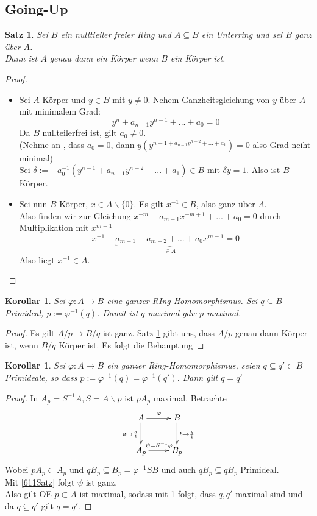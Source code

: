 \documentclass[10pt,a4paper]{article}
\newcounter{thm}[section]
\theoremstyle{definition}
\theoremstyle{plain}
\newtheorem{kor}[thm]{Korollar}
\newtheorem{satz}[thm]{Satz}
\theoremstyle{remark}
\begin{document}
\subsection{Going-Up}

\begin{satz}\label{614Satz}
	Sei $B$ ein nulltieiler freier Ring und $A\subseteq B$ ein Unterring und sei $B$ ganz über $A$.\\
	Dann ist $A$ genau dann ein Körper wenn $B$ ein Körper ist.
\end{satz}
\begin{proof}
	\begin{itemize}
		\item Sei $A$ Körper und $y\in B$ mit $y\neq 0$. Nehem Ganzheitsgleichung von $y$ über $A$ mit minimalem Grad:\\
		\[y^n+a_{n-1}y^{n-1}+...+a_0=0\]
		Da $B$ nullteilerfrei ist, gilt $a_0\neq 0$.\\
		(Nehme an , dass $a_0=0$, dann $y(y^{n-1+a_{n-1}y^{n-2}+...+a_1})=0$ also Grad nciht minimal)\\
		Sei $\delta:=-a_0^{-1}(y^{n-1}+a_{n-1}y^{n-2}+...+a_1)\in B$ mit $\delta y=1.$ Also ist $B$ Körper.
		\item Sei nun $B$ Körper, $x\in A\backslash\{0\}$. Es gilt $x^{-1}\in B$, also ganz über $A$.\\
		Also finden wir zur Gleichung $x^{-m}+a_{m-1}x^{-m+1}+...+a_0=0$ durch Multiplikation mit $x^{m-1}$
		\[x^{-1}+\underbrace{a_{m-1}+a_{m-2}+...+a_0x^{m-1}}_{\in A}=0\]
		Also liegt $x^{-1}\in A$.
	\end{itemize}
\end{proof}

\begin{kor}\label{615Kor}
	Sei $\varphi: A\rightarrow B$ eine ganzer RIng-Homomorphismus. Sei $q\subseteq B$ Primideal, $p:=\varphi^{-1}(q)$. Damit ist $q$ maximal gdw $p$ maximal.
\end{kor}
\begin{proof}
	Es gilt $A/p\rightarrow B/q$ ist ganz. Satz \ref{614Satz} gibt uns, dass $A/p$ genau dann Körper ist, wenn $B/q$ Körper ist. Es folgt die Behauptung
\end{proof}


\begin{kor}
	Sei $\varphi:A\rightarrow B$ ein ganzer Ring-Homomorphismus, seien $q\subseteq q'\subset B$ Primideale, so dass $p:=\varphi^{-1}(q)=\varphi^{-1}(q')$. Dann gilt $q=q'$
\end{kor}
\begin{proof}
	In $A_p=S^{-1}A,S=A\backslash p$ ist $pA_p$ maximal. Betrachte
	\[\xymatrix{
		A\ar[r]^\varphi \ar[d]_{a\mapsto\frac{a}{1}} &B\ar[d]^{b\mapsto\frac{b}{1}}\\
		A_p\ar[r]^{\psi=S^{-1}\varphi}& B_p
	}\]
	Wobei $pA_p\subset A_p$ und $qB_p\subseteq B_p=\varphi^{-1}SB$ und auch $qB_p\subseteq qB_p$ Primideal.\\
	Mit \ref{611Satz} folgt $\psi$ ist ganz.\\
	Also gilt OE $p\subset A$ ist maximal, sodass mit \ref{615Kor} folgt, dass $q,q'$ maximal sind und da $q\subseteq q'$ gilt $q=q'$.
\end{proof}
\end{document}
